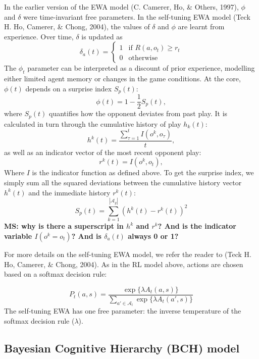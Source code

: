 \documentclass[
  english,
  man,floatsintext]{apa6}
\begin{document}
In the earlier version of the EWA model (C. Camerer, Ho, \& Others, 1997), \(\phi\) and \(\delta\) were time-invariant free parameters. In the self-tuning EWA model (Teck H. Ho, Camerer, \& Chong, 2004), the values of \(\delta\) and \(\phi\) are learnt from experience. Over time, \(\delta\) is updated as
\[\delta_{a}(t) = \begin{cases} 1 & \text{if }  R(a,o_{t}) \geq r_{t}  \\
0 & \text{otherwise} \end{cases}\]
The \(\phi_{t}\) parameter can be interpreted as a discount of prior experience, modelling either limited agent memory or changes in the game conditions. At the core, \(\phi(t)\) depends on a surprise index \(S_{p}(t)\):
\[\phi(t) = 1 - \frac{1}{2}S_{p}(t) ,\]
where \(S_{p}(t)\) quantifies how the opponent deviates from past play. It is calculated in turn through the cumulative history of play \(h_{k}(t)\):
\[h^{k}(t)= \frac{\sum_{\tau =1}^t I(o^k,o_{\tau})}{t}, \]
as well as an indicator vector of the most recent opponent play:
\[r^k(t) = I(o^k,o_{t}), \]
Where \(I\) is the indicator function as defined above. To get the surprise index, we simply sum all the squared deviations between the cumulative history vector \(h^{k}(t)\) and the immediate history \(r^k(t)\):
\[S_{p}(t) = \sum_{k=1}^{|\mathcal{A}_g|} (h^{k}(t) - r^k(t))^2 \]
\textbf{MS: why is there a superscript in \(h^k\) and \(r^k\)? And is the indicator variable \(I(o^k = o_{t})\)? And is \(\delta_a(t)\) always 0 or 1?}

For more details on the self-tuning EWA model, we refer the reader to (Teck H. Ho, Camerer, \& Chong, 2004). As in the RL model above, actions are chosen based on a softmax decision rule:

\[P_t(a,s) = \frac{\exp \{\lambda  A_{t}(a,s) \} }{\sum_{a' \in \mathcal{A}_t} \exp \{ \lambda A_{t}(a',s) \} } \]
The self-tuning EWA has one free parameter: the inverse temperature of the softmax decision rule (\(\lambda\)).

\subsection{Bayesian Cognitive Hierarchy (BCH) model}
\end{document}
